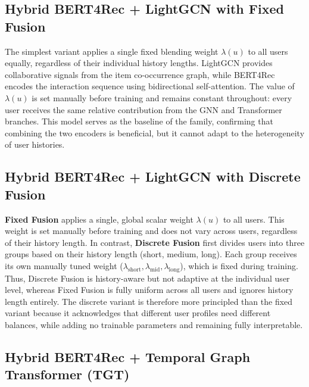 \documentclass[12pt,a4paper]{report}
\begin{document}
\subsection{Hybrid BERT4Rec + LightGCN with Fixed Fusion}
\label{sec:fixed}

\justifying
The simplest variant applies a single fixed blending weight \(\lambda(u)\) to all
users equally, regardless of their individual history lengths. LightGCN provides
collaborative signals from the item co-occurrence graph, while
BERT4Rec~\citep{sun2019bert4rec} encodes the interaction sequence using
bidirectional self-attention. The value of \(\lambda(u)\) is set manually before
training and remains constant throughout: every user receives the same relative
contribution from the GNN and Transformer branches. This model serves as the
baseline of the family, confirming that combining the two encoders is beneficial,
but it cannot adapt to the heterogeneity of user histories.

\subsection{Hybrid BERT4Rec + LightGCN with Discrete Fusion}
\label{sec:discrete}

\justifying
\textbf{Fixed Fusion} applies a single, global scalar weight \(\lambda(u)\) to all
users. This weight is set manually before training and does not vary across
users, regardless of their history length. In contrast, \textbf{Discrete Fusion}
first divides users into three groups based on their history length (short,
medium, long). Each group receives its own manually tuned weight
(\(\lambda_{\text{short}}, \lambda_{\text{mid}}, \lambda_{\text{long}}\)), which is
fixed during training. Thus, Discrete Fusion is history-aware but not adaptive
at the individual user level, whereas Fixed Fusion is fully uniform across all
users and ignores history length entirely. The discrete variant is therefore more
principled than the fixed variant because it acknowledges that different user
profiles need different balances, while adding no trainable parameters and
remaining fully interpretable.

\subsection{Hybrid BERT4Rec + Temporal Graph Transformer (TGT)}
\label{sec:tgt}
\end{document}
